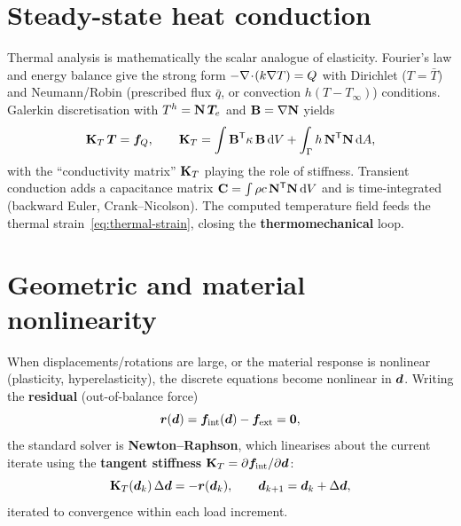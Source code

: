 \section{Steady-state heat conduction}

Thermal analysis is mathematically the scalar analogue of elasticity.
Fourier's law and energy balance give the strong form
$-\nabla\!\cdot\!(k\nabla T)=Q$ with Dirichlet ($T=\bar T$) and Neumann/Robin
(prescribed flux $\bar q$, or convection $h(T-T_\infty)$) conditions.
Galerkin discretisation with $T^h=\mathbf{N}\,\bm{T}_e$ and $\mathbf{B}=\nabla\mathbf{N}$
yields
\begin{equation}
  \mathbf{K}_T\,\bm{T} = \bm{f}_Q, \qquad
  \mathbf{K}_T=\int\mathbf{B}^{\mathsf{T}}\kappa\,\mathbf{B}\,\mathrm{d} V + \int_{\Gamma}h\,\mathbf{N}^{\mathsf{T}}\mathbf{N}\,\mathrm{d} A,
\end{equation}
with the ``conductivity matrix'' $\mathbf{K}_T$ playing the role of stiffness.
Transient conduction adds a capacitance matrix
$\mathbf{C}=\int\rho c\,\mathbf{N}^{\mathsf{T}}\mathbf{N}\,\mathrm{d} V$ and is time-integrated
(backward Euler, Crank--Nicolson). The computed temperature field feeds
the thermal strain~\eqref{eq:thermal-strain}, closing the
\textbf{thermomechanical} loop.

\section{Geometric and material nonlinearity}

When displacements/rotations are large, or the material response is
nonlinear (plasticity, hyperelasticity), the discrete equations become
nonlinear in $\bm{d}$. Writing the \textbf{residual} (out-of-balance
force)
\begin{equation}
  \bm{r}(\bm{d}) = \bm{f}_{\mathrm{int}}(\bm{d}) - \bm{f}_{\mathrm{ext}} = \bm{0},
\end{equation}
the standard solver is \textbf{Newton--Raphson}, which linearises about
the current iterate using the \textbf{tangent stiffness}
$\mathbf{K}_T=\partial\bm{f}_{\mathrm{int}}/\partial\bm{d}$:
\begin{equation}
  \mathbf{K}_T(\bm{d}_k)\,\Delta\bm{d} = -\bm{r}(\bm{d}_k), \qquad
  \bm{d}_{k+1}=\bm{d}_k+\Delta\bm{d},
  \label{eq:newton}
\end{equation}
iterated to convergence within each load increment.

